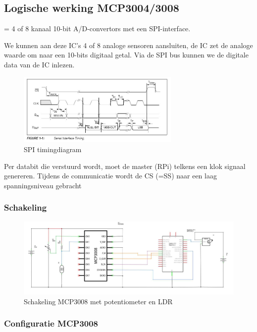 \documentclass{article}
\begin{document}
\subsection{Logische werking MCP3004/3008}
= 4 of 8 kanaal 10-bit A/D-convertors met een SPI-interface.

We kunnen aan deze IC's 4 of 8 analoge sensoren aansluiten, de IC zet de analoge waarde om naar een 10-bits digitaal getal.
Via de SPI bus kunnen we de digitale data van de IC inlezen. 

\begin{figure}[H]
    \centering
    \includegraphics[width=0.7\textwidth]{timing-spi.png}
    \caption{SPI timingdiagram}
\end{figure}

Per databit die verstuurd wordt, moet de master (RPi) telkens een klok signaal genereren.
Tijdens de communicatie wordt de CS (=SS) naar een laag spanningsniveau gebracht

\subsubsection{Schakeling}

\begin{figure}[H]
    \centering
    \includegraphics[width=\textwidth]{mcp.png}
    \caption{Schakeling MCP3008 met potentiometer en LDR}
\end{figure}


\subsubsection{Configuratie MCP3008}
\end{document}
